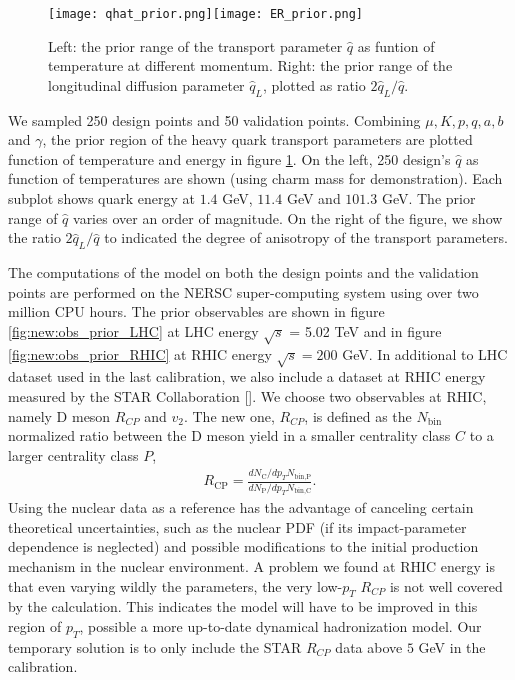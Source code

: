 \begin{figure}
\centering
\texttt{[image: qhat\_prior.png]}\texttt{[image: ER\_prior.png]}
\caption{Left: the prior range of the transport parameter $\hat{q}$ as funtion of temperature at different momentum. Right: the prior range of the longitudinal diffusion parameter $\hat{q}_L$, plotted as ratio $2\hat{q}_L/\hat{q}$.}
\label{fig:new:design-qhat}
\end{figure}

We sampled 250 design points and 50 validation points. 
Combining $\mu, K, p, q, a, b$ and $\gamma$, the prior region of the heavy quark transport parameters are plotted function of temperature and energy in figure \ref{fig:new:design-qhat}. 
On the left, 250 design's $\hat{q}$ as function of temperatures are shown  (using charm mass for demonstration).
Each subplot shows quark energy at $1.4$ GeV, $11.4$ GeV and $101.3$ GeV.
The prior range of $\hat{q}$ varies over an order of magnitude.
On the right of the figure, we show the ratio $2\hat{q}_L/\hat{q}$ to indicated the degree of anisotropy of the transport parameters.

The computations of the model on both the design points and the validation points are performed on the NERSC super-computing system using over two million CPU hours.
The prior observables are shown in figure \ref{fig:new:obs_prior_LHC} at LHC energy $\sqrt{s}$ = 5.02 TeV and in figure \ref{fig:new:obs_prior_RHIC} at RHIC energy $\sqrt{s} = 200$ GeV.
In additional to LHC dataset used in the last calibration, we also include a dataset at RHIC energy measured by the STAR Collaboration [].
We choose two observables at RHIC, namely D meson $R_{CP}$ and $v_2$. 
The new one, $R_{CP}$, is defined as the $N_{\textrm{bin}}$ normalized ratio between the D meson yield in a smaller centrality class $C$ to a larger centrality class $P$,
\begin{eqnarray}
R_{\textrm{CP}} = \frac{dN_\textrm{C}/dp_T N_{\textrm{bin,P}}}{dN_\textrm{P}/dp_T N_{\textrm{bin,C}}}.
\end{eqnarray}
Using the nuclear data as a reference has the advantage of canceling certain theoretical uncertainties, such as the nuclear PDF (if its impact-parameter dependence is neglected) and possible modifications to the initial production mechanism in the nuclear environment.
A problem we found at RHIC energy is that even varying wildly the parameters, the very low-$p_T$ $R_{CP}$ is not well covered by the calculation. 
This indicates the model will have to be improved in this region of $p_T$, possible a more up-to-date dynamical hadronization model.
Our temporary solution is to only include the STAR $R_{CP}$ data above $5$ GeV in the calibration.

